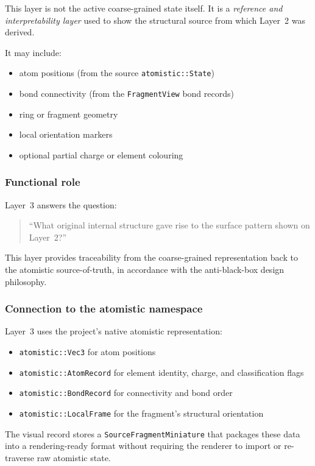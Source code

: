 \documentclass[11pt]{article}
\begin{document}
This layer is not the active coarse-grained state itself.  It is a
\emph{reference and interpretability layer} used to show the structural
source from which Layer~2 was derived.

It may include:
\begin{itemize}
    \item atom positions (from the source \texttt{atomistic::State})
    \item bond connectivity (from the \texttt{FragmentView} bond records)
    \item ring or fragment geometry
    \item local orientation markers
    \item optional partial charge or element colouring
\end{itemize}

\subsubsection{Functional role}

Layer~3 answers the question:
\begin{quote}
``What original internal structure gave rise to the surface pattern
shown on Layer~2?''
\end{quote}

This layer provides traceability from the coarse-grained representation
back to the atomistic source-of-truth, in accordance with the
anti-black-box design philosophy.

\subsubsection{Connection to the atomistic namespace}

Layer~3 uses the project's native atomistic representation:
\begin{itemize}
    \item \texttt{atomistic::Vec3} for atom positions
    \item \texttt{atomistic::AtomRecord} for element identity, charge, and
          classification flags
    \item \texttt{atomistic::BondRecord} for connectivity and bond order
    \item \texttt{atomistic::LocalFrame} for the fragment's structural
          orientation
\end{itemize}

The visual record stores a \texttt{SourceFragmentMiniature} that packages
these data into a rendering-ready format without requiring the renderer to
import or re-traverse raw atomistic state.
\end{document}

